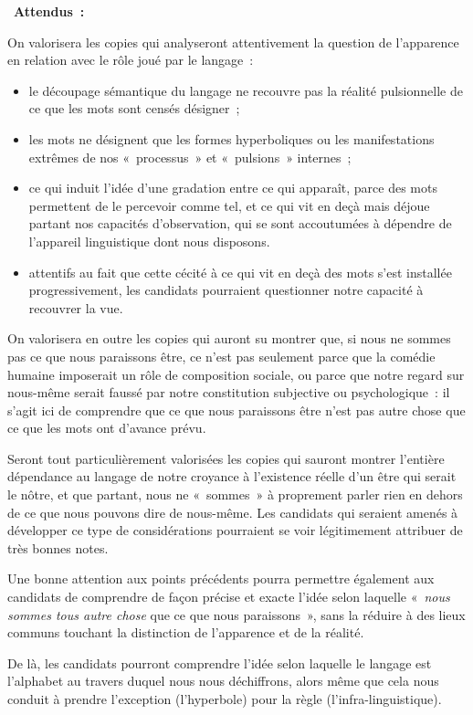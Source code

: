 {\vfill{~}\clearpage\textbf{Attendus~:}

On valorisera les copies qui analyseront attentivement la question de l'apparence en
relation avec le rôle joué par le langage~:

\begin{itemize}
\item le découpage sémantique du langage ne recouvre pas la réalité pulsionnelle de
ce que les mots sont censés désigner~;
\item les mots ne désignent que les formes hyperboliques ou les manifestations
extrêmes de nos «~processus~» et «~pulsions~» internes~;
\item ce qui induit l'idée d'une gradation entre ce qui apparaît, parce des mots
permettent de le percevoir comme tel, et ce qui vit en deçà mais déjoue partant
nos capacités d'observation, qui se sont accoutumées à dépendre de l'appareil
linguistique dont nous disposons.
\item attentifs au fait que cette cécité à ce qui vit en deçà des mots s'est installée
progressivement, les candidats pourraient questionner notre capacité à
recouvrer la vue.
\end{itemize}

On valorisera en outre les copies qui auront su montrer que, si nous ne sommes pas
ce que nous paraissons être, ce n'est pas seulement parce que la comédie humaine
imposerait un rôle de composition sociale, ou parce que notre regard sur nous-même
serait faussé par notre constitution subjective ou psychologique~: il s'agit ici de
comprendre que ce que nous paraissons être n'est pas autre chose que ce que les
mots ont d'avance prévu.

Seront tout particulièrement valorisées les copies qui sauront montrer l'entière
dépendance au langage de notre croyance à l'existence réelle d'un être qui serait le
nôtre, et que partant, nous ne «~sommes~» à proprement parler rien en dehors de ce
que nous pouvons dire de nous-même. Les candidats qui seraient amenés à
développer ce type de considérations pourraient se voir légitimement attribuer de très
bonnes notes.

Une bonne attention aux points précédents pourra permettre également aux candidats
de comprendre de façon précise et exacte l'idée selon laquelle «~\textit{nous sommes tous
autre chose} que ce que nous paraissons~», sans la réduire à des lieux communs
touchant la distinction de l'apparence et de la réalité.

De là, les candidats pourront comprendre l'idée selon laquelle le langage est l'alphabet
au travers duquel nous nous déchiffrons, alors même que cela nous conduit à prendre
l'exception (l'hyperbole) pour la règle (l'infra-linguistique).}%
